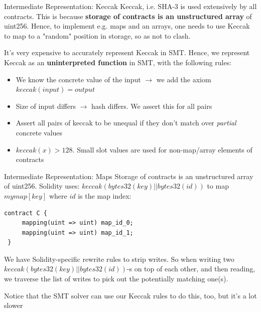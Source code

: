 \documentclass[aspectratio=169]{beamer}
\begin{document}
 \begin{frame}[fragile=singleslide]{Intermediate Representation: Keccak}
 Keccak, i.e. SHA-3 is used extensively by all contracts. This is because \textbf{storage of contracts is an unstructured array} of uint256. Hence, to implement e.g. maps and an arrays, one needs to use Keccak to map to a "random" position in storage, so as not to clash.
 \bigskip

 It's very expensive to accurately represent Keccak in SMT. Hence, we represent Keccak as an \textbf{uninterpreted function} in SMT, with the following rules:
 \begin{itemize}
 \item We know the concrete value of the input $\rightarrow$ we add the axiom $keccak(input)=output$
 \item Size of input differs $\rightarrow$ hash differs. We assert this for all pairs
 \item Assert all pairs of keccak to be unequal if they don't match over \emph{partial} concrete values
 \item $keccak(x) > 128$. Small slot values are used for non-map/array elements of contracts
 \end{itemize}
 \end{frame}

 \begin{frame}[fragile=singleslide]{Intermediate Representation: Maps}
 Storage of contracts is an unstructured array of uint256. Solidity uses: $keccak (bytes32(key) || bytes32(id))$ to map $mymap[key]$ where $id$ is the map index:

 \begin{Verbatim}[frame=single, framerule=0.2mm, framesep=2mm,fontsize=\small]
 contract C {
     mapping(uint => uint) map_id_0;
     mapping(uint => uint) map_id_1;
 }
 \end{Verbatim}
 We have Solidity-specific rewrite rules to strip writes. So when writing two $keccak (bytes32(key) || bytes32(id))$-s on top of each other, and then reading, we traverse the list of writes to pick out the potentially matching one(s).
 \bigskip

 Notice that the SMT solver can use our Keccak rules to do this, too, but it's a lot slower
 \end{frame}
\end{document}
